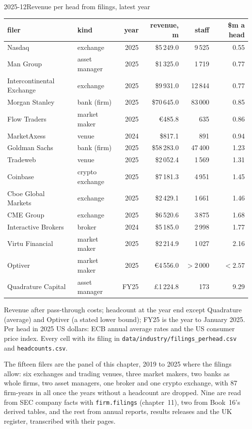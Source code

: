 \begin{dated}{2025-12}{Revenue per head from filings, latest year}\label{dat:in:revenue-and-profit-across-the-industry:table}
\footnotesize
\begin{tabular}{@{}llrrrr@{}}
\toprule
filer & kind & year & revenue, m & staff & \$m a head\\
\midrule
Nasdaq & exchange & 2025 & \$5\,249.0 & 9\,525 & 0.55\\
Man Group & asset manager & 2025 & \$1\,325.0 & 1\,719 & 0.77\\
Intercontinental Exchange & exchange & 2025 & \$9\,931.0 & 12\,844 & 0.77\\
Morgan Stanley & bank (firm) & 2025 & \$70\,645.0 & 83\,000 & 0.85\\
Flow Traders & market maker & 2025 & \euro485.8 & 635 & 0.86\\
MarketAxess & venue & 2024 & \$817.1 & 891 & 0.94\\
Goldman Sachs & bank (firm) & 2025 & \$58\,283.0 & 47\,400 & 1.23\\
Tradeweb & venue & 2025 & \$2\,052.4 & 1\,569 & 1.31\\
Coinbase & crypto exchange & 2025 & \$7\,181.3 & 4\,951 & 1.45\\
Cboe Global Markets & exchange & 2025 & \$2\,429.1 & 1\,661 & 1.46\\
CME Group & exchange & 2025 & \$6\,520.6 & 3\,875 & 1.68\\
Interactive Brokers & broker & 2024 & \$5\,185.0 & 2\,998 & 1.77\\
Virtu Financial & market maker & 2025 & \$2\,214.9 & 1\,027 & 2.16\\
Optiver & market maker & 2025 & \euro4\,556.0 & $>2\,000$ & $<2.57$\\
Quadrature Capital & asset manager & FY25 & \pounds1\,224.8 & 173 & 9.29\\
\bottomrule
\end{tabular}

\smallskip\noindent Revenue after pass-through costs; headcount at the year end except Quadrature (average) and
Optiver (a stated lower bound); FY25 is the year to January 2025. Per head in 2025 US dollars: ECB annual average rates and the US consumer price index.
Every cell with its filing in \texttt{data/industry/filings\_perhead.csv} and \texttt{headcounts.csv}.
\end{dated}

The fifteen filers are the panel of this chapter, 2019 to 2025 where the filings allow: six exchanges and trading
venues, three market makers, two banks as whole firms, two asset managers, one broker and one crypto exchange, with 87
firm-years in all once the years without a headcount are dropped. Nine are read from SEC company facts with
\texttt{firm.filings} (chapter~11), two from Book~16's derived tables, and the rest from annual reports, results releases
and the UK register, transcribed with their pages.

